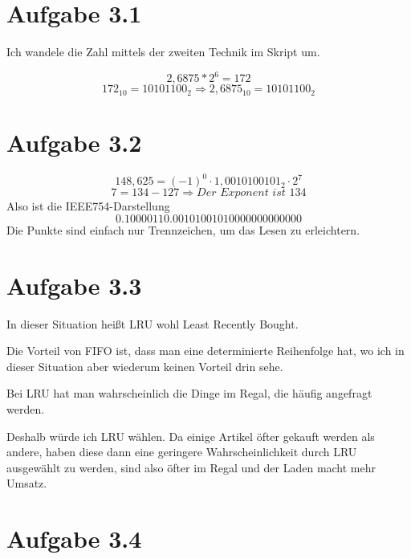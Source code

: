 \documentclass[10pt,a4paper]{article}
\begin{document}
\section*{Aufgabe 3.1}

Ich wandele die Zahl mittels der zweiten Technik im Skript um.

\begin{equation}
2,6875 * 2^{6} = 172
\end{equation}
\begin{equation}
172_{10} = 10101100_{2} \Rightarrow 2,6875_{10} = 10101100_{2}
\end{equation}

\section*{Aufgabe 3.2}

\begin{equation}
148,625 = (-1)^0 \cdot 1,0010100101_{2} \cdot 2^{7}
\end{equation}
\begin{equation}
7 = 134 - 127 \Rightarrow \textit{Der Exponent ist $134$}
\end{equation}
Also ist die IEEE754-Darstellung
\begin{equation}
0.10000110.00101001010000000000000
\end{equation}
Die Punkte sind einfach nur Trennzeichen, um das Lesen zu erleichtern.

\section*{Aufgabe 3.3}

In dieser Situation heißt LRU wohl Least Recently Bought.

Die Vorteil von FIFO ist, dass man eine determinierte Reihenfolge hat, wo ich in dieser Situation aber wiederum keinen Vorteil drin sehe.

Bei LRU hat man wahrscheinlich die Dinge im Regal, die häufig angefragt werden.

Deshalb würde ich LRU wählen.
Da einige Artikel öfter gekauft werden als andere, haben diese dann eine geringere Wahrscheinlichkeit durch LRU ausgewählt zu werden, sind also öfter im Regal und der Laden macht mehr Umsatz.

\section*{Aufgabe 3.4}
\end{document}

